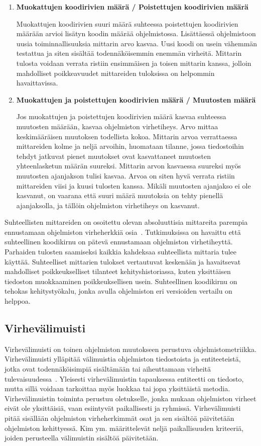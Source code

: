 \documentclass[finnish]{tktltiki2}
\theoremstyle{definition}
\theoremstyle{remark}
\begin{document}
\begin{enumerate}
    \item \textbf{Muokattujen koodirivien määrä / Poistettujen koodirivien määrä}

      Muokattujen koodirivien suuri määrä suhteessa poistettujen koodirivien määrään arvioi lisätyn koodin määrää ohjelmistossa. Lisättäessä ohjelmistoon uusia toiminnallisuuksia mittarin arvo kasvaa. Uusi koodi on usein vähemmän testattua ja siten sisältää todennäköisemmin enemmän virheitä. Mittarin tulosta voidaan verrata ristiin ensimmäisen ja toisen mittarin kanssa, jolloin mahdolliset poikkeavuudet mittareiden tuloksissa on helpommin havaittavissa.
    \item \textbf{Muokattujen ja poistettujen koodirivien määrä / Muutosten määrä}

      Jos muokattujen ja poistettujen koodirivien määrä kasvaa suhteessa muutosten määrään, kasvaa ohjelmiston virhetiheys. Arvo mittaa keskimääräisen muutoksen todellista kokoa. Mittarin arvoa verrattaessa mittareiden kolme ja neljä arvoihin, huomataan tilanne, jossa tiedostoihin tehdyt jatkuvat pienet muutokset ovat kasvattaneet muutosten yhteenlasketun määrän suureksi. Mittarin arvon kasvaessa suureksi myös muutosten ajanjakson tulisi kasvaa. Arvoa on siten hyvä verrata ristiin mittareiden viisi ja kuusi tulosten kanssa. Mikäli muutosten ajanjakso ei ole kasvanut, on vaarana että suuri määrä muutoksia on tehty pienellä ajanjaksolla, ja tällöin ohjelmiston virhetiheys on kasvanut.

\end{enumerate}

Suhteellisten mittareiden on osoitettu olevan absoluuttisia mittareita parempia ennustamaan ohjelmiston virheherkkiä osia~\cite{NB05}. Tutkimuksissa on havaittu että suhteellinen koodikirnu on pätevä ennustamaan ohjelmiston virhetiheyttä. Parhaiden tulosten saamiseksi kaikkia kahdeksaa suhteellista mittaria tulee käyttää. Suhteelliset mittarien tulokset vertautuvat keskenään ja havaitsevat mahdolliset poikkeukselliset tilanteet kehityshistoriassa, kuten yksittäisen tiedoston muokkaaminen poikkeuksellisen usein. Suhteellinen koodikirnu on tehokas kehitystyökalu, jonka avulla ohjelmiston eri versioiden vertailu on helppoa.

\subsection{Virhevälimuisti}

Virhevälimuisti on toinen ohjelmiston muutokseen perustuva ohjelmistometriikka. Virhevälimuisti ylläpitää välimuistia ohjelmiston tiedostoista ja entiteeteistä, jotka ovat todennäköisimpiä sisältämään tai aiheuttamaan virheitä tulevaisuudessa~\cite{KZWZ07}. Yleisesti virhevälimuistin tapauksessa entiteetti on tiedosto, mutta sillä voidaan tarkoittaa myös luokkaa tai jopa yksittäistä metodia. Virhevälimuistin toiminta perustuu oletukselle, jonka mukaan ohjelmiston virheet eivät ole yksittäisiä, vaan esiintyvät paikallisesti ja ryhmissä. Virhevälimuisti pitää sisällään ohjelmiston virheherkimmät osat ja sen sisältöä päivitetään ohjelmiston kehittyessä. Kim ym. määrittelevät neljä paikallisuuden kriteeriä, joiden perusteella välimuistin sisältöä päivitetään.
\end{document}
